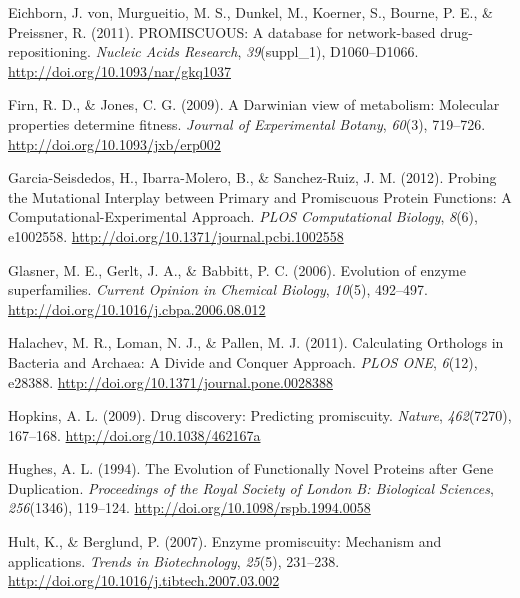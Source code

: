 \documentclass[12pt,twoside]{reedthesis}
\begin{document}
  \hypertarget{ref-vonux5feichbornux5fpromiscuous:ux5f2011}{}
  Eichborn, J. von, Murgueitio, M. S., Dunkel, M., Koerner, S., Bourne, P.
  E., \& Preissner, R. (2011). PROMISCUOUS: A database for network-based
  drug-repositioning. \emph{Nucleic Acids Research}, \emph{39}(suppl\_1),
  D1060--D1066. \url{http://doi.org/10.1093/nar/gkq1037}
  
  \hypertarget{ref-firnux5fdarwinianux5f2009}{}
  Firn, R. D., \& Jones, C. G. (2009). A Darwinian view of metabolism:
  Molecular properties determine fitness. \emph{Journal of Experimental
  Botany}, \emph{60}(3), 719--726. \url{http://doi.org/10.1093/jxb/erp002}
  
  \hypertarget{ref-garcia-seisdedosux5fprobingux5f2012}{}
  Garcia-Seisdedos, H., Ibarra-Molero, B., \& Sanchez-Ruiz, J. M. (2012).
  Probing the Mutational Interplay between Primary and Promiscuous Protein
  Functions: A Computational-Experimental Approach. \emph{PLOS
  Computational Biology}, \emph{8}(6), e1002558.
  \url{http://doi.org/10.1371/journal.pcbi.1002558}
  
  \hypertarget{ref-glasnerux5fevolutionux5f2006}{}
  Glasner, M. E., Gerlt, J. A., \& Babbitt, P. C. (2006). Evolution of
  enzyme superfamilies. \emph{Current Opinion in Chemical Biology},
  \emph{10}(5), 492--497. \url{http://doi.org/10.1016/j.cbpa.2006.08.012}
  
  \hypertarget{ref-halachevux5fcalculatingux5f2011}{}
  Halachev, M. R., Loman, N. J., \& Pallen, M. J. (2011). Calculating
  Orthologs in Bacteria and Archaea: A Divide and Conquer Approach.
  \emph{PLOS ONE}, \emph{6}(12), e28388.
  \url{http://doi.org/10.1371/journal.pone.0028388}
  
  \hypertarget{ref-hopkinsux5fdrugux5f2009}{}
  Hopkins, A. L. (2009). Drug discovery: Predicting promiscuity.
  \emph{Nature}, \emph{462}(7270), 167--168.
  \url{http://doi.org/10.1038/462167a}
  
  \hypertarget{ref-hughesux5fevolutionux5f1994}{}
  Hughes, A. L. (1994). The Evolution of Functionally Novel Proteins after
  Gene Duplication. \emph{Proceedings of the Royal Society of London B:
  Biological Sciences}, \emph{256}(1346), 119--124.
  \url{http://doi.org/10.1098/rspb.1994.0058}
  
  \hypertarget{ref-hultux5fenzymeux5f2007}{}
  Hult, K., \& Berglund, P. (2007). Enzyme promiscuity: Mechanism and
  applications. \emph{Trends in Biotechnology}, \emph{25}(5), 231--238.
  \url{http://doi.org/10.1016/j.tibtech.2007.03.002}
  
\end{document}
